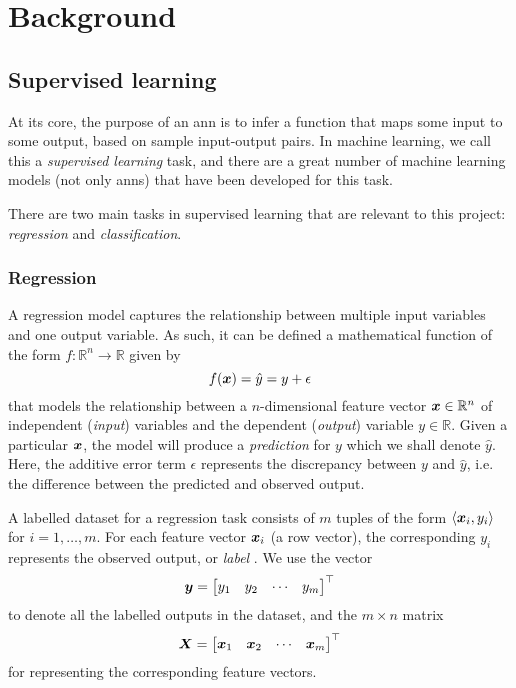 \documentclass[../main.tex]{subfiles}
\begin{document}
\chapter{Background}

\section{Supervised learning}
At its core, the purpose of an \gls{ann} is to infer a function that maps some input to some output, based on sample input-output pairs.
In machine learning, we call this a \emph{supervised learning} task, and there are a great number of machine learning models (not only \glspl{ann}) that have been developed for this task.

There are two main tasks in supervised learning that are relevant to this project: \emph{regression} and \emph{classification}.

\subsection{Regression}
A regression model captures the relationship between multiple input variables and one output variable. 
As such, it can be defined a mathematical function of the form $f:\mathbb{R}^n\rightarrow \mathbb{R}$ given by
\begin{equation}
    \label{eq:reg_model}
    f({\bm{x}}) = \hat{y} = y + \epsilon
\end{equation}
that models the relationship between a $n$-dimensional feature vector ${\bm{x}} \in \mathbb{R}^n$ of independent (\emph{input}) variables and the dependent (\emph{output}) variable $y \in \mathbb{R}$. 
Given a particular ${\bm{x}}$, the model will produce a \emph{prediction} for $y$ which we shall denote $\hat{y}$.
Here, the additive error term $\epsilon$ represents the discrepancy between $y$ and $\hat{y}$, i.e. the difference between the predicted and observed output.

A labelled dataset for a regression task consists of $m$ tuples of the form $\langle {\bm{x}}_i, y_i\rangle$ for $i=1,\dots,m$.
For each feature vector ${\bm{x}}_i$ (a row vector), the corresponding $y_i$ represents the observed output, or \emph{label} \cite{burkov2019}.
We use the vector
\begin{equation}
    \label{eq:sup_learn_target}
    {\bm{y}} = \begin{bmatrix}
        y_1 & y_2 & \cdots & y_m
    \end{bmatrix}^\top
\end{equation}
to denote all the labelled outputs in the dataset, and the $m \times n$ matrix
\begin{equation}
    \label{eq:sup_learn_input_matrix}
    {\bm{X}} = \begin{bmatrix}
        {\bm{x}}_1 & {\bm{x}}_2 & \cdots & {\bm{x}}_m
    \end{bmatrix}^\top
\end{equation}
for representing the corresponding feature vectors.
\end{document}
